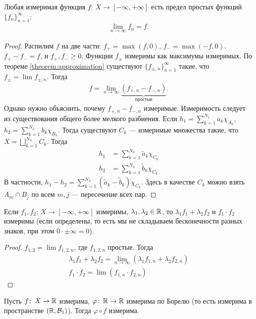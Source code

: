 \begin{crly}
 \label{corollary:simple_function_approximation_maybe_negative}
 Любая измеримая функция $f \colon\, X \to [-\infty, +\infty] $ есть предел простых функций $\{f_{n}\}_{n=1}^{\infty} $: \begin{align*}
  \lim_{n \to \infty} f_n = f
 .\end{align*} 
\end{crly}
\begin{proof}
Распилим $f$ на две части: $f_+ = \max(f, 0)$, $f_- = \max(-f, 0)$. $f_+ - f_- = f$, и  $f_+, f_- \geqslant 0$. Функции $f_{\pm}$ измеримы как максимумы измеримых. По теореме \ref{theorem:approximation} существуют $\{f_{\pm,n}\}_{n=1}^{\infty} $ такие, что $f_{\pm} = \lim f_{\pm,n}$. Тогда \begin{align*}
  f = \lim_{n \to \infty} \underbrace{(f_{+,n} - f_{-,n})}_{\text{ простые }}
 .\end{align*} Однако нужно объяснить, почему $f_{+,n} - f_{-,n}$ измеримые. Измеримость следует из существования общего более мелкого разбиения. Если  $h_1 = \sum_{k=1}^{N_1} a_k \chi_{A_k}$, $h_2 = \sum_{k=1}^{N_2} b_k \chi_{B_k}$. Тогда существуют $C_k$ --- измеримые множества такие, что  $X = \bigsqcup_{k=1}^{N_3} C_k $. Тогда \begin{align*}
 h_1 &= \sum_{k=1}^{N_3} \tilde a_{k} \chi_{C_k} \\
 h_2 &= \sum_{k=1}^{N_3} \tilde b_{k} \chi_{C_k}
\end{align*} В частности, $h_1 - h_2 = \sum_{k=1}^{N_3} (\tilde a_k - \tilde b_k) \chi_{C_k}$. Здесь в качестве $C_k$ можно взять $A_m \cap B_j$ по всем $m,j$ --- пересечение всех пар.
\end{proof}
\begin{crly}
 Если $f_1,f_2 \colon\, X \to [-\infty, +\infty] $ измеримы, $\lambda_1, \lambda_2 \in \mathbb{R}$, то $\lambda_1 f_1 + \lambda_2 f_2$ и $f_1 \cdot f_2$ измеримы (если определены, то есть мы не складываем бесконечности разных знаков, при этом $0 \cdot \pm \infty = 0$).
\end{crly}
\begin{proof}
 $ f_{1,2} = \lim f_{1,2,n} $, где $f_{1,2,n}$ простые. Тогда \begin{align*}
  \lambda_1 f_1 + \lambda_2 f_2 = \lim_{n \to \infty} \left( \lambda_1 f_{1,n} + \lambda_2 f_{2,n} \right) \\
  f_1 \cdot f_2 = \lim (f_{1,n} \cdot f_{2,n})
 \end{align*} 
\end{proof}
\begin{crly}
 Пусть $f \colon\, X \to \mathbb{R}  $ измерима, $\varphi \colon\, \mathbb{R} \to \mathbb{R}  $ измерима по Борелю (то есть измерима в пространстве $(\mathbb{R}, \mathcal{B}_1)$). Тогда $\varphi \circ f$ измерима.
\end{crly}
